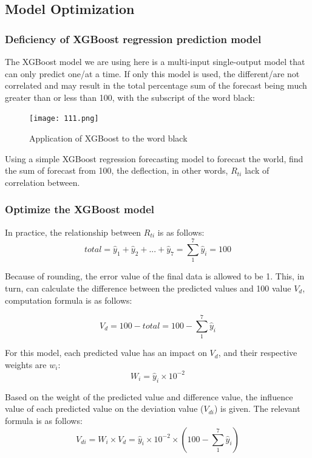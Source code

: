 \documentclass[12pt]{article}  %
\begin{document}
\subsection{Model Optimization}
\subsubsection{Deficiency of XGBoost regression prediction model}
The XGBoost model we are using here is a multi-input single-output model that can only predict one/at a time. If only this model is used, the different/are not correlated and may result in the total percentage sum of the forecast being much greater than or less than 100, with the subscript of the word black:
\begin{figure}[htbp]
\centering
\texttt{[image: 111.png]}
\caption{Application of XGBoost to the word black}\label{fig:result}
\end{figure}

Using a simple XGBoost regression forecasting model to forecast the world, find the sum of forecast from 100, the deflection, in other words, $R_{ti}$ lack of correlation between.

\subsubsection{Optimize the XGBoost model}
In practice, the relationship between $R_{ti}$ is as follows:
\begin{equation}
total=\hat{y}_1+\hat{y}_2+...+\hat{y}_7={\textstyle \sum_{1}^{7}} \hat{y}_i=100
\end{equation}

Because of rounding, the error value of the final data is allowed to be 1.
This, in turn, can calculate the difference between the predicted values and 100 value $V_d$, computation formula is as follows:

\begin{equation}
V_d=100-total=100-{\textstyle \sum_{1}^{7}} \hat{y}_i
\end{equation}

For this model, each predicted value has an impact on $V_d$, and their respective weights are $w_i$:
\begin{equation}
W_i=\hat{y}_i\times10^{-2}
\end{equation}

Based on the weight of the predicted value and difference value, the influence value of each predicted value on the deviation value ($V_{di}$) is given. The relevant formula is as follows:
\begin{equation}\label{eq:difference}
V_{di}=W_i\times V_d=\hat{y}_i\times10^{-2}\times(100-{\textstyle \sum_{1}^{7}} \hat{y}_i)
\end{equation}
\end{document}
